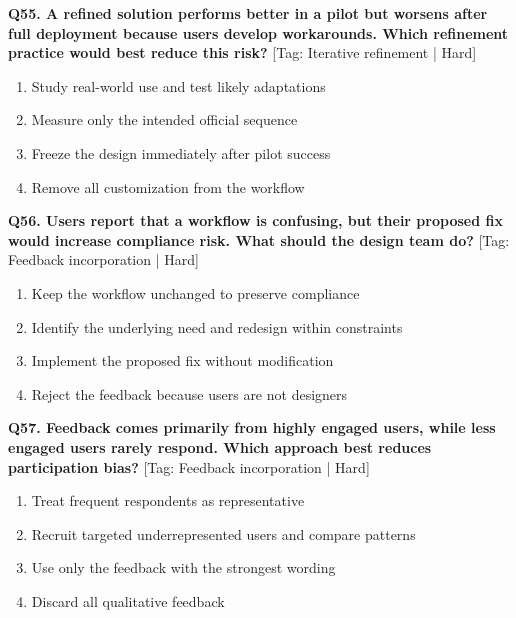 \noindent\textbf{Q55. A refined solution performs better in a pilot but worsens after full deployment because users develop workarounds. Which refinement practice would best reduce this risk?} \hfill [Tag: Iterative refinement | Hard]
\begin{enumerate}[label=(\alph*),topsep=2pt,itemsep=1pt,partopsep=0pt,parsep=0pt]
    \item {Study real-world use and test likely adaptations}
    \item {Measure only the intended official sequence}
    \item {Freeze the design immediately after pilot success}
    \item {Remove all customization from the workflow}
\end{enumerate}
\vspace{2mm}

\noindent\textbf{Q56. Users report that a workflow is confusing, but their proposed fix would increase compliance risk. What should the design team do?} \hfill [Tag: Feedback incorporation | Hard]
\begin{enumerate}[label=(\alph*),topsep=2pt,itemsep=1pt,partopsep=0pt,parsep=0pt]
    \item {Keep the workflow unchanged to preserve compliance}
    \item {Identify the underlying need and redesign within constraints}
    \item {Implement the proposed fix without modification}
    \item {Reject the feedback because users are not designers}
\end{enumerate}
\vspace{2mm}

\noindent\textbf{Q57. Feedback comes primarily from highly engaged users, while less engaged users rarely respond. Which approach best reduces participation bias?} \hfill [Tag: Feedback incorporation | Hard]
\begin{enumerate}[label=(\alph*),topsep=2pt,itemsep=1pt,partopsep=0pt,parsep=0pt]
    \item {Treat frequent respondents as representative}
    \item {Recruit targeted underrepresented users and compare patterns}
    \item {Use only the feedback with the strongest wording}
    \item {Discard all qualitative feedback}
\end{enumerate}
\vspace{2mm}

